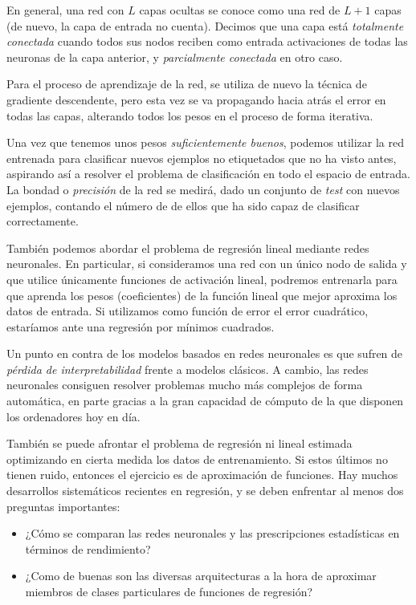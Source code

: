 \documentclass[
  a4paper,
  12pt,
  spanish,
]{scrartcl}
\theoremstyle{teorema-style}
\begin{document}
En general, una red con $L$ capas ocultas se conoce como una red de $L+1$ capas (de nuevo, la capa de entrada no cuenta). Decimos que una capa está \textit{totalmente conectada} cuando todos sus nodos reciben como entrada activaciones de todas las neuronas de la capa anterior, y \textit{parcialmente conectada} en otro caso.

Para el proceso de aprendizaje de la red, se utiliza de nuevo la técnica de gradiente descendente, pero esta vez se va propagando hacia atrás el error en todas las capas, alterando todos los pesos en el proceso de forma iterativa.

Una vez que tenemos unos pesos \textit{suficientemente buenos}, podemos utilizar la red entrenada para clasificar nuevos ejemplos no etiquetados que no ha visto antes, aspirando así a resolver el problema de clasificación en todo el espacio de entrada. La bondad o \textit{precisión} de la red se medirá, dado un conjunto de \textit{test} con nuevos ejemplos, contando el número de de ellos que ha sido capaz de clasificar correctamente.

También podemos abordar el problema de regresión lineal mediante redes neuronales. En particular, si consideramos una red con un único nodo de salida y que utilice únicamente funciones de activación lineal, podremos entrenarla para que aprenda los pesos (coeficientes) de la función lineal que mejor aproxima los datos de entrada. Si utilizamos como función de error el error cuadrático, estaríamos ante una regresión por mínimos cuadrados.

Un punto en contra de los modelos basados en redes neuronales es que sufren de \textit{pérdida de interpretabilidad} frente a modelos clásicos. A cambio, las redes neuronales consiguen resolver problemas mucho más complejos de forma automática, en parte gracias a la gran capacidad de cómputo de la que disponen los ordenadores hoy en día.

También se puede afrontar el problema de regresión ni lineal estimada  optimizando en cierta medida los datos de entrenamiento. Si estos últimos no tienen ruido, entonces el ejercicio es de aproximación de funciones. Hay muchos desarrollos sistemáticos recientes en regresión, y se deben enfrentar al menos dos preguntas importantes:

\begin{itemize}
\item ¿Cómo se comparan las redes neuronales y las prescripciones estadísticas en términos de rendimiento?
\item ¿Como de buenas son las diversas arquitecturas a la hora de aproximar miembros de clases particulares de funciones de regresión?
\end{itemize}
\end{document}

